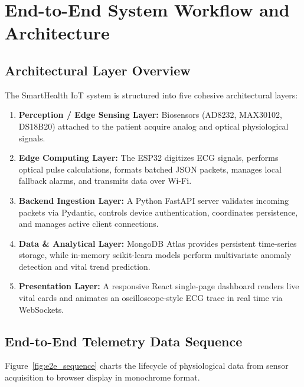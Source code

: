 \documentclass[12pt]{article}
\begin{document}
\section{End-to-End System Workflow and Architecture}
\label{sec:system_workflow}

\subsection{Architectural Layer Overview}
The SmartHealth IoT system is structured into five cohesive architectural layers:
\begin{enumerate}
    \item \textbf{Perception / Edge Sensing Layer:} Biosensors (AD8232, MAX30102, DS18B20) attached to the patient acquire analog and optical physiological signals.
    \item \textbf{Edge Computing Layer:} The ESP32 digitizes ECG signals, performs optical pulse calculations, formats batched JSON packets, manages local fallback alarms, and transmits data over Wi-Fi.
    \item \textbf{Backend Ingestion Layer:} A Python FastAPI server validates incoming packets via Pydantic, controls device authentication, coordinates persistence, and manages active client connections.
    \item \textbf{Data \& Analytical Layer:} MongoDB Atlas provides persistent time-series storage, while in-memory scikit-learn models perform multivariate anomaly detection and vital trend prediction.
    \item \textbf{Presentation Layer:} A responsive React single-page dashboard renders live vital cards and animates an oscilloscope-style ECG trace in real time via WebSockets.
\end{enumerate}

\subsection{End-to-End Telemetry Data Sequence}
Figure~\ref{fig:e2e_sequence} charts the lifecycle of physiological data from sensor acquisition to browser display in monochrome format.
\end{document}
